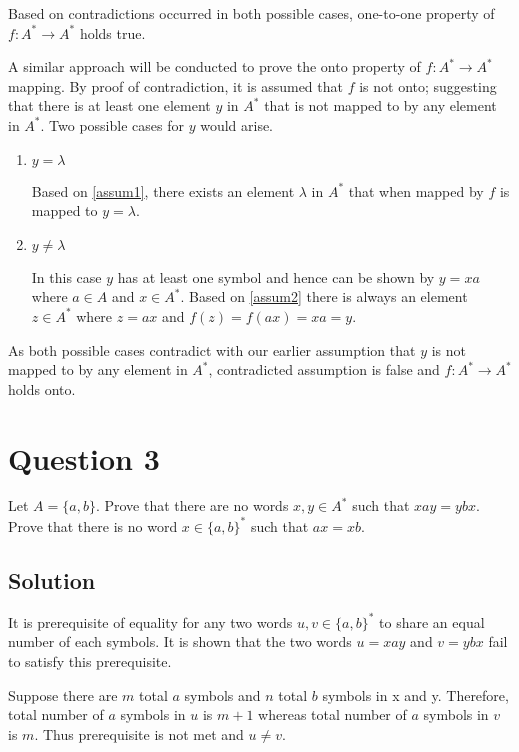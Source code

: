 Based on contradictions occurred in both possible cases, one-to-one property of $f:A^*\rightarrow A^*$ holds true.

A similar approach will be conducted to prove the onto property of $f:A^*\rightarrow A^*$ mapping.
By proof of contradiction, it is assumed that $f$ is not onto; suggesting that there is at least one element $y$ in $A^*$ that is not mapped to by any element in $A^*$.
Two possible cases for $y$ would arise.

\begin{enumerate}[label=(\alph*)]
\item $y = \lambda$

Based on \eqref{assum1}, there exists an element $\lambda$ in $A^*$ that when mapped by $f$ is mapped to $y = \lambda$.
\item $y \neq \lambda$

In this case $y$ has at least one symbol and hence can be shown by $y=xa$ where $a \in A$ and $x \in A^*$.
Based on \eqref{assum2} there is always an element $z \in A^*$ where $z = ax$ and $f(z) = f(ax) = xa = y$.

\end{enumerate}

As both possible cases contradict with our earlier assumption that $y$ is not mapped to by any element in $A^*$, contradicted assumption is false and $f:A^*\rightarrow A^*$ holds onto.

\section{Question 3}

Let $A = \{a,b\}$.
Prove that there are no words $x, y \in A^*$ such that $xay = ybx$.
Prove that there is no word $x \in \{a,b\}^*$ such that $ax = xb$.

\subsection*{Solution}

It is prerequisite of equality for any two words $u, v \in \{a,b\}^*$ to share an equal number of each symbols.
It is shown that the two words $u=xay$ and $v=ybx$ fail to satisfy this prerequisite.

Suppose there are $m$ total $a$ symbols and $n$ total $b$ symbols in x and y.
Therefore, total number of $a$ symbols in $u$ is $m+1$ whereas total number of $a$ symbols in $v$ is $m$.
Thus prerequisite is not met and $u \neq v$.


